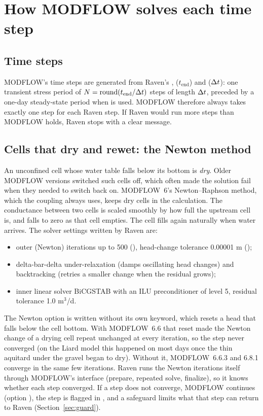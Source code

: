 \section{How MODFLOW solves each time step}\label{ch:mf6}
\subsection{Time steps}
MODFLOW's time steps are generated from Raven's ,  ($t_{\mathrm{end}}$) and  ($\Delta t$): one transient
stress period of $N=\mathrm{round}(t_{\mathrm{end}}/\Delta t)$ steps of length $\Delta t$, preceded by a one-day steady-state period when
 is used. MODFLOW therefore always takes exactly one step for each Raven step.
If Raven would run more steps than MODFLOW holds, Raven stops with a clear message.

\subsection{Cells that dry and rewet: the Newton method}
An unconfined cell whose water table falls below its bottom is \emph{dry}. Older MODFLOW versions switched such cells
off, which often made the solution fail when they needed to switch back on. MODFLOW~6's Newton--Raphson method, which the coupling always uses, keeps dry cells in the calculation. The conductance
between two cells is scaled smoothly by how full the upstream cell is, and falls to zero as that cell empties. The cell
fills again naturally when water arrives. The solver settings written by Raven are:
\begin{itemize}
\item outer (Newton) iterations up to 500 (), head-change tolerance 0.00001 m ();
\item delta-bar-delta under-relaxation (damps oscillating head changes) and backtracking (retries a smaller change
when the residual grows);
\item inner linear solver BiCGSTAB with an ILU preconditioner of level 5, residual tolerance 1.0 m$^3$/d.
\end{itemize}
The Newton option is written without its own  keyword, which resets a head that falls below the cell
bottom. With MODFLOW~6.6 that reset made the Newton change of a drying cell repeat unchanged at every iteration, so the
step never converged (on the Liard model this happened on most days once the thin aquitard under the gravel began to dry).
Without it, MODFLOW~6.6.3 and 6.8.1 converge in the same few iterations.
Raven runs the Newton iterations itself through MODFLOW's interface (prepare, repeated solve, finalize), so it knows
whether each step converged. If a step does not converge, MODFLOW continues (option ), the step is
flagged in , and a safeguard limits what that step can return to Raven (Section~\ref{sec:guard}).

